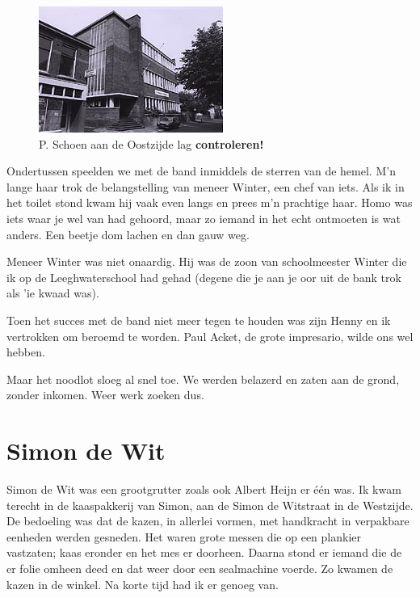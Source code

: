 \documentclass[10pt,twoside, openright]{memoir}
\begin{document}
\begin{figure}
\includegraphics[width=\textwidth]{img/ch34/image}
\caption*{\footnotesize P. Schoen aan de Oostzijde lag \textbf{controleren!}}
\end{figure}

Ondertussen speelden we met de band inmiddels de sterren van de hemel. M’n lange haar trok de belangstelling van meneer Winter, een chef van iets. Als ik in het toilet stond kwam hij vaak even langs en prees m’n prachtige haar. Homo was iets waar je wel van had gehoord, maar zo iemand in het echt ontmoeten is wat anders. Een beetje dom lachen en dan gauw weg. 

Meneer Winter was niet onaardig. Hij was de zoon van schoolmeester Winter die ik op de Leeghwaterschool had gehad (degene die je aan je oor uit de bank trok als 'ie kwaad was). 

Toen het succes met de band niet meer tegen te houden was zijn Henny en ik vertrokken om beroemd te worden. Paul Acket, de grote impresario, wilde ons wel hebben.

Maar het noodlot sloeg al snel toe. We werden belazerd en zaten aan de grond, zonder inkomen. Weer werk zoeken dus.

\chapter{Simon de Wit} %
\label{cha:wit}

Simon de Wit was een grootgrutter zoals ook Albert Heijn er één was. Ik kwam terecht in de kaaspakkerij van Simon, aan de Simon de Witstraat in de Westzijde. De bedoeling was dat de kazen, in allerlei vormen, met handkracht in verpakbare eenheden werden gesneden. Het waren grote messen die op een plankier vastzaten; kaas eronder en het mes er doorheen. Daarna stond er iemand die de er folie omheen deed en dat weer door een sealmachine voerde. Zo kwamen de kazen in de winkel. Na korte tijd had ik er genoeg van.
\end{document}
